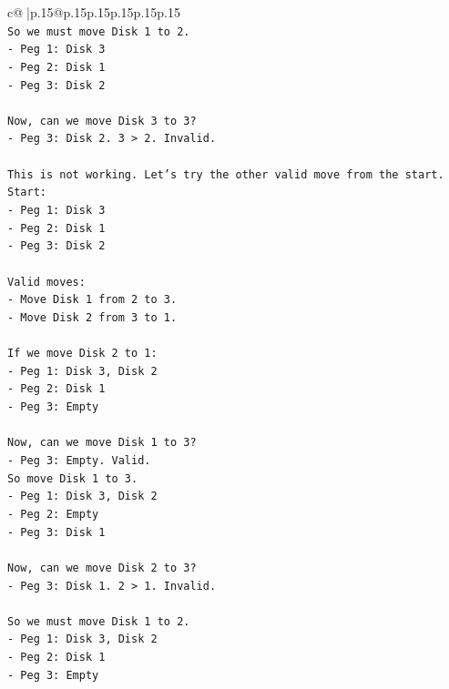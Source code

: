 \documentclass{article}
\begin{document}
{\begin{supertabular}{c@{$\;$}|p{.15\linewidth}@{}p{.15\linewidth}p{.15\linewidth}p{.15\linewidth}p{.15\linewidth}p{.15\linewidth}}
{{{\\ 
\texttt{So we must move Disk 1 to 2.} \\
\texttt{{-} Peg 1: Disk 3} \\
\texttt{{-} Peg 2: Disk 1} \\
\texttt{{-} Peg 3: Disk 2} \\
\\ 
\texttt{Now, can we move Disk 3 to 3?} \\
\texttt{{-} Peg 3: Disk 2. 3 > 2. Invalid.} \\
\\ 
\texttt{This is not working. Let's try the other valid move from the start.} \\
\texttt{Start:} \\
\texttt{{-} Peg 1: Disk 3} \\
\texttt{{-} Peg 2: Disk 1} \\
\texttt{{-} Peg 3: Disk 2} \\
\\ 
\texttt{Valid moves:} \\
\texttt{{-} Move Disk 1 from 2 to 3.} \\
\texttt{{-} Move Disk 2 from 3 to 1.} \\
\\ 
\texttt{If we move Disk 2 to 1:} \\
\texttt{{-} Peg 1: Disk 3, Disk 2} \\
\texttt{{-} Peg 2: Disk 1} \\
\texttt{{-} Peg 3: Empty} \\
\\ 
\texttt{Now, can we move Disk 1 to 3?} \\
\texttt{{-} Peg 3: Empty. Valid.} \\
\texttt{So move Disk 1 to 3.} \\
\texttt{{-} Peg 1: Disk 3, Disk 2} \\
\texttt{{-} Peg 2: Empty} \\
\texttt{{-} Peg 3: Disk 1} \\
\\ 
\texttt{Now, can we move Disk 2 to 3?} \\
\texttt{{-} Peg 3: Disk 1. 2 > 1. Invalid.} \\
\\ 
\texttt{So we must move Disk 1 to 2.} \\
\texttt{{-} Peg 1: Disk 3, Disk 2} \\
\texttt{{-} Peg 2: Disk 1} \\
\texttt{{-} Peg 3: Empty} \\
}}}
\end{supertabular}}
\end{document}
